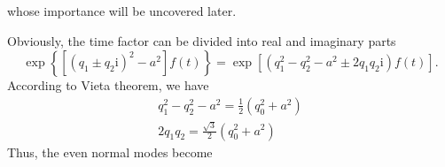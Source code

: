 whose importance will be uncovered later.\par
Obviously, the time factor can be divided into real and imaginary parts
\begin{equation*}
	\exp\left\{ \left[\left( q_1\pm q_2\mathrm{i} \right)^2-a^2 \right]f\left( t \right)\right\}=\exp\left[\left( q_1^2-q_2^2-a^2\pm 2 q_1 q_2\mathrm{i} \right)f\left( t \right)\right].
\end{equation*}
According to Vieta theorem, we have
\begin{gather*}
	q_1^2-q_2^2-a^2=\frac{1}{2}\left(q_0^2+a^2\right)\\
	2q_1q_2=\frac{\sqrt{3}}{2}\left(q_0^2+a^2\right)
\end{gather*}
Thus, the even normal modes become
